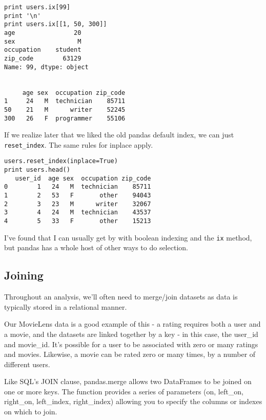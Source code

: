 \documentclass[]{article}
\begin{document}
\begin{framed}
\begin{verbatim}
print users.ix[99]
print '\n'
print users.ix[[1, 50, 300]]
age                20
sex                 M
occupation    student
zip_code        63129
Name: 99, dtype: object


     age sex  occupation zip_code
1     24   M  technician    85711
50    21   M      writer    52245
300   26   F  programmer    55106
\end{verbatim}
\end{framed}

If we realize later that we liked the old pandas default index, we can just \texttt{reset\_index}. The same rules for inplace apply.
\begin{framed}
\begin{verbatim}
users.reset_index(inplace=True)
print users.head()
   user_id  age sex  occupation zip_code
0        1   24   M  technician    85711
1        2   53   F       other    94043
2        3   23   M      writer    32067
3        4   24   M  technician    43537
4        5   33   F       other    15213
\end{verbatim}
\end{framed}


I've found that I can usually get by with boolean indexing and the \texttt{ix} method, but pandas has a whole host of other ways to do selection.

\newpage
\subsection{Joining}

Throughout an analysis, we'll often need to merge/join datasets as data is typically stored in a relational manner.

Our MovieLens data is a good example of this - a rating requires both a user and a movie, and the datasets are linked together by a key - in this case, the user\_id and movie\_id. It's possible for a user to be associated with zero or many ratings and movies. Likewise, a movie can be rated zero or many times, by a number of different users.

Like SQL's JOIN clause, pandas.merge allows two DataFrames to be joined on one or more keys. The function provides a series of parameters (on, left\_on, right\_on, left\_index, right\_index) allowing you to specify the columns or indexes on which to join.
\end{document}
